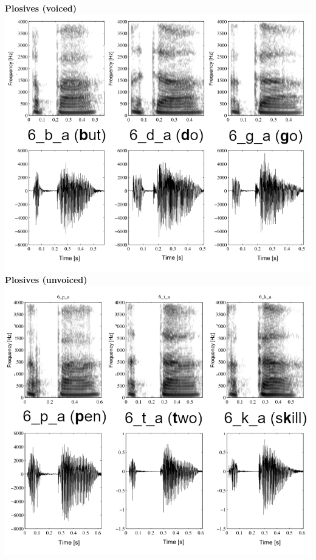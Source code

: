 \begin{minipage}[t]{0.32\textwidth}
\centering
\textbf{Plosives (voiced)}
\includegraphics[width=\textwidth]{img/plosives_voiced}
\textbf{Plosives (unvoiced)}
\includegraphics[width=\textwidth]{img/plosives_unvoiced.png}
\end{minipage}


